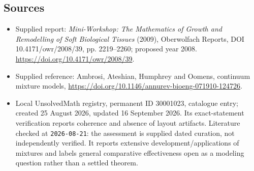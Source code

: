 \documentclass[11pt]{article}
\begin{document}
\subsection{Sources}
\begin{itemize}
\item Supplied report: \emph{Mini-Workshop: The Mathematics of Growth and Remodelling of Soft Biological Tissues} (2009), Oberwolfach Reports, DOI 10.4171/owr/2008/39, pp. 2219--2260; proposed year 2008. \url{https://doi.org/10.4171/owr/2008/39}.
\item Supplied reference: Ambrosi, Ateshian, Humphrey and Oomens, continuum mixture models, \url{https://doi.org/10.1146/annurev-bioeng-071910-124726}.
\item Local UnsolvedMath registry, permanent ID 30001023, catalogue entry; created 25 August 2026, updated 16 September 2026. Its exact-statement verification reports coherence and absence of layout artifacts. Literature checked at \texttt{2026-08-21}: the assessment is supplied dated curation, not independently verified. It reports extensive development/applications of mixtures and labels general comparative effectiveness open as a modeling question rather than a settled theorem.
\end{itemize}
\end{document}
